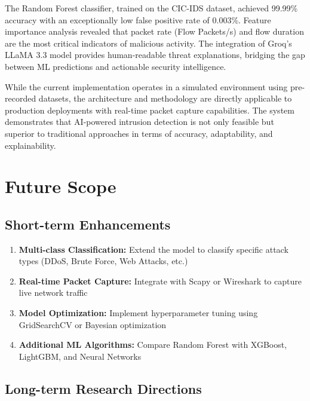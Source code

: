 \documentclass[12pt,a4paper]{article}
\begin{document}
The Random Forest classifier, trained on the CIC-IDS dataset, achieved 99.99\% accuracy with an exceptionally low false positive rate of 0.003\%. Feature importance analysis revealed that packet rate (Flow Packets/s) and flow duration are the most critical indicators of malicious activity. The integration of Groq's LLaMA 3.3 model provides human-readable threat explanations, bridging the gap between ML predictions and actionable security intelligence.

While the current implementation operates in a simulated environment using pre-recorded datasets, the architecture and methodology are directly applicable to production deployments with real-time packet capture capabilities. The system demonstrates that AI-powered intrusion detection is not only feasible but superior to traditional approaches in terms of accuracy, adaptability, and explainability.

\section{Future Scope}

\subsection{Short-term Enhancements}

\begin{enumerate}
    \item \textbf{Multi-class Classification:} Extend the model to classify specific attack types (DDoS, Brute Force, Web Attacks, etc.)
    
    \item \textbf{Real-time Packet Capture:} Integrate with Scapy or Wireshark to capture live network traffic
    
    \item \textbf{Model Optimization:} Implement hyperparameter tuning using GridSearchCV or Bayesian optimization
    
    \item \textbf{Additional ML Algorithms:} Compare Random Forest with XGBoost, LightGBM, and Neural Networks
\end{enumerate}

\subsection{Long-term Research Directions}
\end{document}
